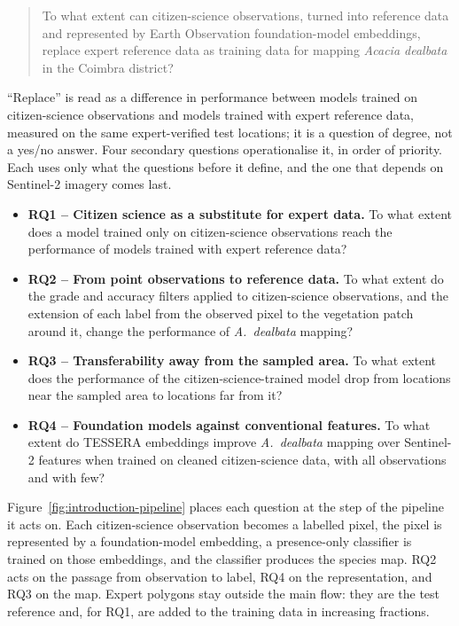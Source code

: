 \begin{quote}
To what extent can citizen-science observations, turned into
reference data and represented by Earth Observation foundation-model
embeddings, replace expert reference data as training data for
mapping \emph{Acacia dealbata} in the Coimbra district?
\end{quote}

``Replace'' is read as a difference in performance between models
trained on citizen-science observations and models trained with
expert reference data, measured on the same expert-verified test
locations; it is a question of degree, not a yes/no answer. Four
secondary questions operationalise it, in order of priority. Each
uses only what the questions before it define, and the one that
depends on Sentinel-2 imagery comes last.

\begin{itemize}
  \item \textbf{RQ1 -- Citizen science as a substitute for expert
  data.} To what extent does a model trained only on citizen-science
  observations reach the performance of models trained with expert
  reference data?
  \item \textbf{RQ2 -- From point observations to reference data.} To
  what extent do the grade and accuracy filters applied to
  citizen-science observations, and the extension of each label from
  the observed pixel to the vegetation patch around it, change the
  performance of \emph{A.~dealbata} mapping?
  \item \textbf{RQ3 -- Transferability away from the sampled area.}
  To what extent does the performance of the citizen-science-trained
  model drop from locations near the sampled area to locations far
  from it?
  \item \textbf{RQ4 -- Foundation models against conventional
  features.} To what extent do TESSERA embeddings improve
  \emph{A.~dealbata} mapping over Sentinel-2 features when trained on
  cleaned citizen-science data, with all observations and with few?
\end{itemize}

Figure~\ref{fig:introduction-pipeline} places each question at the
step of the pipeline it acts on. Each citizen-science observation
becomes a labelled pixel, the pixel is represented by a
foundation-model embedding, a presence-only classifier is trained on
those embeddings, and the classifier produces the species map. RQ2
acts on the passage from observation to label, RQ4 on the
representation, and RQ3 on the map. Expert polygons stay outside the
main flow: they are the test reference and, for RQ1, are added to the
training data in increasing fractions.


